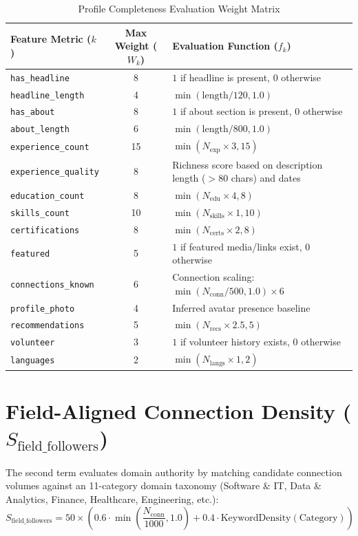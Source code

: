 \documentclass[11pt,a4paper]{report}
\begin{document}
\begin{table}[h!]
\centering
\small
\begin{tabularx}{\textwidth}{l c X}
\toprule
\textbf{Feature Metric ($k$)} & \textbf{Max Weight ($W_k$)} & \textbf{Evaluation Function ($f_k$)} \\
\midrule
\texttt{has\_headline} & 8 & $1$ if headline is present, $0$ otherwise \\
\texttt{headline\_length} & 4 & $\min(\text{length} / 120, 1.0)$ \\
\texttt{has\_about} & 8 & $1$ if about section is present, $0$ otherwise \\
\texttt{about\_length} & 6 & $\min(\text{length} / 800, 1.0)$ \\
\texttt{experience\_count} & 15 & $\min(N_{\text{exp}} \times 3, 15)$ \\
\texttt{experience\_quality} & 8 & Richness score based on description length ($>80$ chars) and dates \\
\texttt{education\_count} & 8 & $\min(N_{\text{edu}} \times 4, 8)$ \\
\texttt{skills\_count} & 10 & $\min(N_{\text{skills}} \times 1, 10)$ \\
\texttt{certifications} & 8 & $\min(N_{\text{certs}} \times 2, 8)$ \\
\texttt{featured} & 5 & $1$ if featured media/links exist, $0$ otherwise \\
\texttt{connections\_known} & 6 & Connection scaling: $\min(N_{\text{conn}} / 500, 1.0) \times 6$ \\
\texttt{profile\_photo} & 4 & Inferred avatar presence baseline \\
\texttt{recommendations} & 5 & $\min(N_{\text{recs}} \times 2.5, 5)$ \\
\texttt{volunteer} & 3 & $1$ if volunteer history exists, $0$ otherwise \\
\texttt{languages} & 2 & $\min(N_{\text{langs}} \times 1, 2)$ \\
\bottomrule
\end{tabularx}
\caption{Profile Completeness Evaluation Weight Matrix}
\label{tab:scoring_matrix}
\end{table}

\section{Field-Aligned Connection Density ($S_{\text{field\_followers}}$)}
The second term evaluates domain authority by matching candidate connection volumes against an 11-category domain taxonomy (Software \& IT, Data \& Analytics, Finance, Healthcare, Engineering, etc.):
\begin{equation}
    S_{\text{field\_followers}} = 50 \times \left( 0.6 \cdot \min\left(\frac{N_{\text{conn}}}{1000}, 1.0\right) + 0.4 \cdot \text{KeywordDensity}(\text{Category}) \right)
\end{equation}
\end{document}

